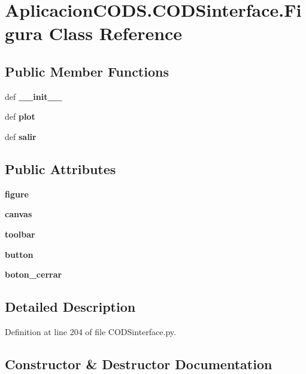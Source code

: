 \section{\-Aplicacion\-C\-O\-D\-S.\-C\-O\-D\-Sinterface.\-Figura \-Class \-Reference}
\label{class_aplicacion_c_o_d_s_1_1_c_o_d_sinterface_1_1_figura}
\subsection*{\-Public \-Member \-Functions}
\begin{DoxyCompactItemize}
\item 
def {\bf \-\_\-\-\_\-init\-\_\-\-\_\-}
\item 
def {\bf plot}
\item 
def {\bf salir}
\end{DoxyCompactItemize}
\subsection*{\-Public \-Attributes}
\begin{DoxyCompactItemize}
\item 
{\bf figure}
\item 
{\bf canvas}
\item 
{\bf toolbar}
\item 
{\bf button}
\item 
{\bf boton\-\_\-cerrar}
\end{DoxyCompactItemize}


\subsection{\-Detailed \-Description}


\-Definition at line 204 of file \-C\-O\-D\-Sinterface.\-py.



\subsection{\-Constructor \& \-Destructor \-Documentation}
